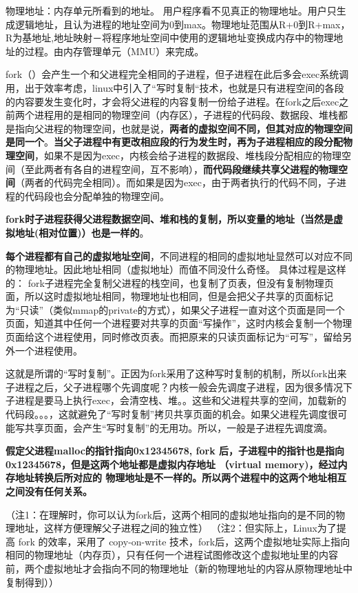 \documentclass[UTF8,a4paper,12pt]{ctexbook}
\begin{document}
			物理地址：内存单元所看到的地址。
			用户程序看不见真正的物理地址。用户只生成逻辑地址，且认为进程的地址空间为0到max。物理地址范围从R+0到R+max，R为基地址,地址映射－将程序地址空间中使用的逻辑地址变换成内存中的物理地址的过程。由内存管理单元（MMU）来完成。
			
			fork（）会产生一个和父进程完全相同的子进程，但子进程在此后多会exec系统调用，出于效率考虑，linux中引入了“写时复制“技术，也就是只有进程空间的各段的内容要发生变化时，才会将父进程的内容复制一份给子进程。在fork之后exec之前两个进程用的是相同的物理空间（内存区），子进程的代码段、数据段、堆栈都是指向父进程的物理空间，也就是说，\textbf{两者的虚拟空间不同，但其对应的物理空间是同一个}。\textbf{当父子进程中有更改相应段的行为发生时，再为子进程相应的段分配物理空间}，如果不是因为exec，内核会给子进程的数据段、堆栈段分配相应的物理空间（至此两者有各自的进程空间，互不影响），\textbf{而代码段继续共享父进程的物理空间}（两者的代码完全相同）。而如果是因为exec，由于两者执行的代码不同，子进程的代码段也会分配单独的物理空间。
			
			\textbf{fork时子进程获得父进程数据空间、堆和栈的复制，所以变量的地址（当然是虚拟地址(相对位置)）也是一样的}。
			
			\textbf{每个进程都有自己的虚拟地址空间}，不同进程的相同的虚拟地址显然可以对应不同的物理地址。因此地址相同（虚拟地址）而值不同没什么奇怪。
			具体过程是这样的：
			fork子进程完全复制父进程的栈空间，也复制了页表，但没有复制物理页面，所以这时虚拟地址相同，物理地址也相同，但是会把父子共享的页面标记为“只读”（类似mmap的private的方式），如果父子进程一直对这个页面是同一个页面，知道其中任何一个进程要对共享的页面“写操作”，这时内核会复制一个物理页面给这个进程使用，同时修改页表。而把原来的只读页面标记为“可写”，留给另外一个进程使用。
			
			这就是所谓的“写时复制”。正因为fork采用了这种写时复制的机制，所以fork出来子进程之后，父子进程哪个先调度呢？内核一般会先调度子进程，因为很多情况下子进程是要马上执行exec，会清空栈、堆。。这些和父进程共享的空间，加载新的代码段。。。，这就避免了“写时复制”拷贝共享页面的机会。如果父进程先调度很可能写共享页面，会产生“写时复制”的无用功。所以，一般是子进程先调度滴。
			
			\textbf{假定父进程malloc的指针指向0x12345678, fork 后，子进程中的指针也是指向0x12345678，但是这两个地址都是虚拟内存地址 （virtual memory)，经过内存地址转换后所对应的 物理地址是不一样的。所以两个进程中的这两个地址相互之间没有任何关系。}
			
			
			（注1：在理解时，你可以认为fork后，这两个相同的虚拟地址指向的是不同的物理地址，这样方便理解父子进程之间的独立性）
			（注2：但实际上，Linux为了提高 fork 的效率，采用了 copy-on-write 技术，fork后，这两个虚拟地址实际上指向相同的物理地址（内存页），只有任何一个进程试图修改这个虚拟地址里的内容前，两个虚拟地址才会指向不同的物理地址（新的物理地址的内容从原物理地址中复制得到））
\end{document}

